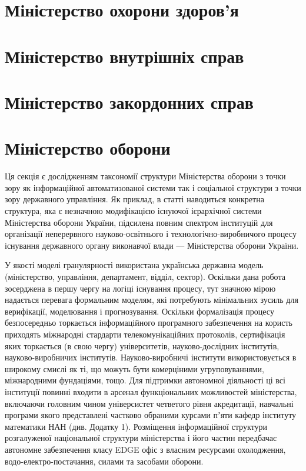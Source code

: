 \section{Міністерство охорони здоров'я}

\section{Міністерство внутрішніх справ}

\section{Міністерство закордонних справ}

\section{Міністерство оборони}

Ця секція є дослідженням таксономії структури Міністерства
оборони з точки зору як інформаційної автоматизованої системи
так і соціальної структури з точки зору державного управління.
Як приклад, в статті наводиться конкретна структура, яка є незначною
модифікацією існуючої ієрархічної системи Міністерства оборони України,
підсилена повним спектром інституцій для організації неперервного
науково-освітнього і технологічно-виробничого процесу існування
державного органу виконавчої влади — Міністерства оборони України.

У якості моделі гранулярності використана українська державна модель
(міністерство, управління, департамент, відділ, сектор). Оскільки дана робота
зосерджена в першу чергу на логіці існування процесу, тут значною мірою
надається перевага формальним моделям, які потребують мінімальних зусиль
для верифікації, моделювання і прогнозування. Оскільки формалізація процесу
безпосередньо торкається інформаційного програмного забезпечення на користь
приходять міжнародні стардарти телекомунікаційних протоколів, сертифікація
яких торкається (в свою чергу) університетів, науково-дослідних інститутів,
науково-виробничих інститутів. Науково-виробничі інститути використовується
в широкому смислі як ті, що можуть бути комерціними угруповуваннями,
міжнародними фундаціями, тощо. Для підтримки автономної діяльності ці
всі інституції повинні входити в арсенал функціональних можливостей
міністерства, включаючи головним чином універсистет четветого рівня
акредитації, навчальні програми якого представлені частково обраними
курсами пʼяти кафедр інституту математики НАН (див. Додатку 1).
Розміщення інформаційної структури розгалуженої національної
структури міністерства і його частин передбачає автономне
забезпечення класу EDGE офіс з власним ресурсами охолодження,
водо-електро-постачання, силами та засобами оборони.

